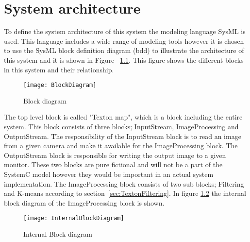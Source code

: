 \chapter{System architecture}

To define the system architecture of this system the modeling language SysML is used. This language includes a wide range of modeling tools however it is chosen to use the SysML block definition diagram (bdd) to illustrate the architecture of this system and it is shown in Figure ~\ref{fig:BlockDiagram}. This figure shows the different blocks in this system and their relationship. 

\begin{figure}[H]
\centering
\texttt{[image: BlockDiagram]}
\caption{Block diagram}
\label{fig:BlockDiagram}
\end{figure}

The top level block is called "Texton map", which is a block including the entire system. This block consists of three blocks; InputStream, ImageProcessing and OutputStream. The responsibility of the InputStream block is to read an image from a given camera and make it available for the ImageProcessing block. The OutputStream block is responsible for writing the output image to a given monitor. These two blocks are pure fictional and will not be a part of the SystemC model however they would be important in an actual system implementation. The ImageProcessing block consists of two sub blocks; Filtering and K-means according to section~\ref{sec:TextonFiltering}. In figure \ref{fig:InternalBlockDiagram} the internal block diagram of the ImageProcessing block is shown.

\begin{figure}[H]
\centering
\texttt{[image: InternalBlockDiagram]}
\caption{Internal Block diagram}
\label{fig:InternalBlockDiagram}
\end{figure}